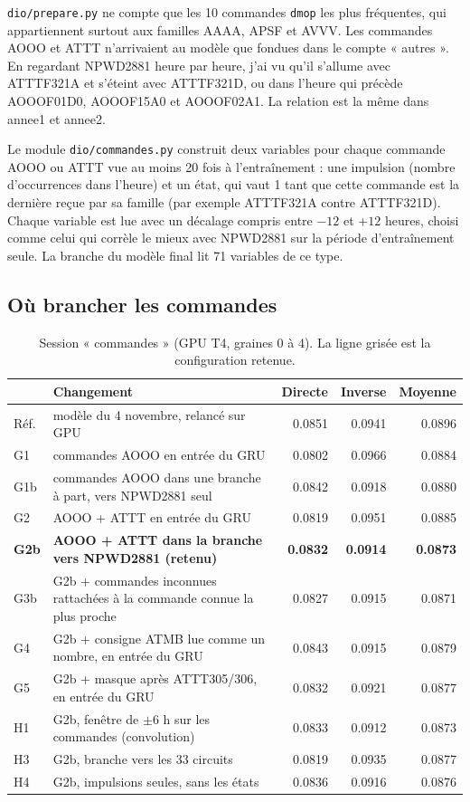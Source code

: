 \documentclass[11pt,a4paper]{article}
\newcommand{\code}[1]{\texttt{#1}}
\begin{document}
\code{dio/prepare.py} ne compte que les 10 commandes \code{dmop} les plus fréquentes, qui appartiennent surtout aux familles AAAA, APSF et AVVV. Les commandes AOOO et ATTT n'arrivaient au modèle que fondues dans le compte « autres ». En regardant NPWD2881 heure par heure, j'ai vu qu'il s'allume avec ATTTF321A et s'éteint avec ATTTF321D, ou dans l'heure qui précède AOOOF01D0, AOOOF15A0 et AOOOF02A1. La relation est la même dans annee1 et annee2.

Le module \code{dio/commandes.py} construit deux variables pour chaque commande AOOO ou ATTT vue au moins 20 fois à l'entraînement : une impulsion (nombre d'occurrences dans l'heure) et un état, qui vaut 1 tant que cette commande est la dernière reçue par sa famille (par exemple ATTTF321A contre ATTTF321D). Chaque variable est lue avec un décalage compris entre $-12$ et $+12$ heures, choisi comme celui qui corrèle le mieux avec NPWD2881 sur la période d'entraînement seule. La branche du modèle final lit 71 variables de ce type.

\subsection{Où brancher les commandes}

\begin{table}[!htb]
\centering\small
\caption{Session « commandes » (GPU T4, graines 0 à 4). La ligne grisée est la configuration retenue.}
\label{tab:commandes}
\begin{tabularx}{\linewidth}{l X r r r}
\toprule
 & Changement & Directe & Inverse & Moyenne \\
\midrule
Réf. & modèle du 4 novembre, relancé sur GPU & 0.0851 & 0.0941 & 0.0896 \\
G1 & commandes AOOO en entrée du GRU & 0.0802 & 0.0966 & 0.0884 \\
G1b & commandes AOOO dans une branche à part, vers NPWD2881 seul & 0.0842 & 0.0918 & 0.0880 \\
G2 & AOOO + ATTT en entrée du GRU & 0.0819 & 0.0951 & 0.0885 \\
\rowcolor{fond} \textbf{G2b} & \textbf{AOOO + ATTT dans la branche vers NPWD2881 (retenu)} & \textbf{0.0832} & \textbf{0.0914} & \textbf{0.0873} \\
G3b & G2b + commandes inconnues rattachées à la commande connue la plus proche & 0.0827 & 0.0915 & 0.0871 \\
G4 & G2b + consigne ATMB lue comme un nombre, en entrée du GRU & 0.0843 & 0.0915 & 0.0879 \\
G5 & G2b + masque après ATTT305/306, en entrée du GRU & 0.0832 & 0.0921 & 0.0877 \\
H1 & G2b, fenêtre de $\pm 6$ h sur les commandes (convolution) & 0.0833 & 0.0912 & 0.0873 \\
H3 & G2b, branche vers les 33 circuits & 0.0819 & 0.0935 & 0.0877 \\
H4 & G2b, impulsions seules, sans les états & 0.0836 & 0.0916 & 0.0876 \\
\bottomrule
\end{tabularx}
\end{table}
\end{document}
